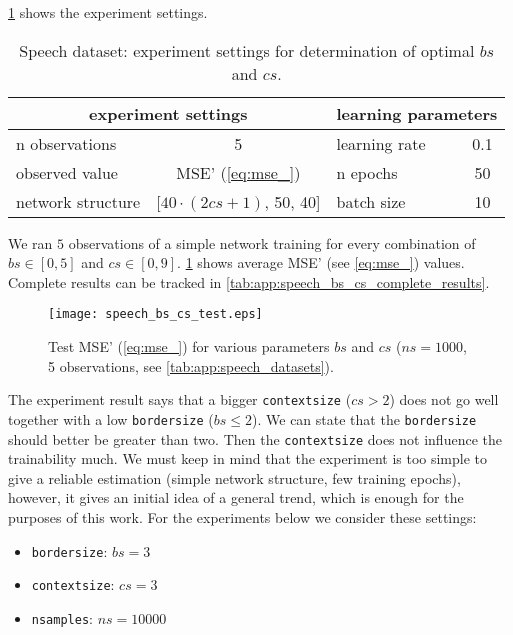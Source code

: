 \cref{tab:examples:speech_bs_cs_determination} shows the experiment settings.

\begin{table}[H]
\centering
\begin{tabular}{|l|c|l|c|}
\hline
\multicolumn{2}{|c|}{experiment settings}   & \multicolumn{2}{c|}{learning parameters} \\ \hline
n observations    & 5                       & learning rate            & 0.1           \\ \hline
observed value    & MSE' (\cref{eq:mse_})    & n epochs                 & 50            \\ \hline
network structure & {[}$ 40 \cdot (2cs+1) $, 50, 40{]} & batch size               & 10            \\ \hline
\end{tabular}
\caption{Speech dataset: experiment settings for determination of optimal $ bs $ and $ cs $.}
\label{tab:examples:speech_bs_cs_determination}
\end{table}

We ran $ 5 $ observations of a simple network training for every combination of $ bs \in [0, 5] $ and $ cs \in [0, 9] $. \cref{fig:examples:speech_bs_cs_test} shows average MSE' (see \cref{eq:mse_}) values. Complete results can be tracked in \cref{tab:app:speech_bs_cs_complete_results}.

\begin{figure}[H]
\centering
\texttt{[image: speech\_bs\_cs\_test.eps]}
\caption{Test MSE' (\cref{eq:mse_}) for various parameters $ bs $ and $ cs $ ($ ns = 1000 $, 5 observations, see \cref{tab:app:speech_datasets}).}
\label{fig:examples:speech_bs_cs_test}
\end{figure}

The experiment result says that a bigger \texttt{context\textunderscore size} ($ cs > 2 $) does not go well together with a low \texttt{border\textunderscore size} ($ bs \leq 2 $). We can state that the \texttt{border\textunderscore size} should better be greater than two. Then the \texttt{context\textunderscore size} does not influence the trainability much. We must keep in mind that the experiment is too simple to give a reliable estimation (simple network structure, few training epochs), however, it gives an initial idea of a general trend, which is enough for the purposes of this work. For the experiments below we consider these settings:

\begin{itemize}
\item \texttt{border\textunderscore size}: $ bs = 3 $
\item \texttt{context\textunderscore size}: $ cs = 3 $
\item \texttt{n\textunderscore samples}: $ ns = 10000 $
\end{itemize}

